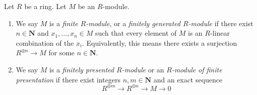 \begin{definition}
\label{definition-module-finite-type}
Let $R$ be a ring. Let $M$ be an $R$-module.
\begin{enumerate}
\item We say $M$ is a {\it finite $R$-module}, or a {\it finitely generated
$R$-module} if there exist $n \in \mathbf{N}$ and $x_1, \ldots, x_n \in M$
such that every element of $M$ is an $R$-linear combination of the $x_i$.
Equivalently, this means there exists a surjection
$R^{\oplus n} \to M$ for some $n \in \mathbf{N}$.
\item We say $M$ is a {\it finitely presented $R$-module} or an
{\it $R$-module of finite presentation} if there exist integers
$n, m \in \mathbf{N}$ and an exact sequence
$$
R^{\oplus m} \longrightarrow R^{\oplus n} \longrightarrow M \longrightarrow 0
$$
\end{enumerate}
\end{definition}
